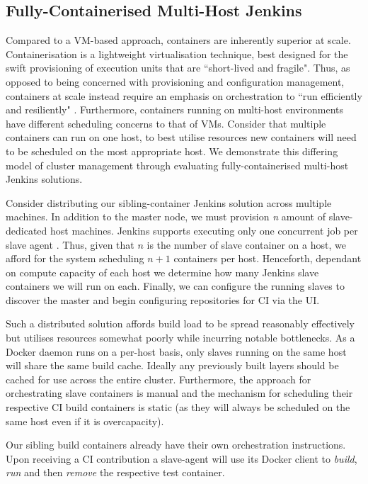 \documentclass[journal]{IEEEtran}
\begin{document}
\subsection{Fully-Containerised Multi-Host Jenkins}
Compared to a VM-based approach, containers are inherently superior at scale.
Containerisation is a lightweight virtualisation technique, best designed for 
the swift provisioning of execution units that are ``short-lived and fragile".
Thus, as opposed to being concerned with provisioning and configuration management,
containers at scale instead require an emphasis on orchestration to ``run efficiently
and resiliently" \citep{Rensin}. Furthermore, containers running on multi-host environments
have different scheduling concerns to that of VMs. Consider that multiple containers can run
on one host, to best utilise resources new containers will need to be scheduled on the most appropriate
host. We demonstrate this differing model of cluster management through evaluating fully-containerised multi-host Jenkins 
solutions.
\par
Consider distributing our sibling-container Jenkins solution across multiple machines.
In addition to the master node, we must provision \textit{n} amount of slave-dedicated host machines. 
Jenkins supports executing only one concurrent job per slave agent \citep{Smart}. Thus, given that \(n\) is the number
of slave container on a host, we afford for the system scheduling \(n+1\) containers per host. Henceforth, 
dependant on compute capacity of each host we determine how many Jenkins slave containers we will run on each. 
Finally,  we can configure the running slaves to discover the master and begin configuring repositories for CI via the UI. 
\par 
Such a distributed solution
affords build load to be spread reasonably effectively but utilises resources somewhat poorly while incurring notable bottlenecks.
As a Docker daemon runs on a per-host basis, only slaves running on the same host will share the same
build cache. Ideally any previously built layers should be cached for use across the entire cluster.
Furthermore, the approach for orchestrating slave containers
is manual and the mechanism for scheduling their respective CI build containers is static (as they will always
be scheduled on the same host even if it is overcapacity).
\par
Our sibling build containers already have their own orchestration instructions. Upon receiving a CI contribution a 
slave-agent will use its Docker client to \textit{build}, \textit{run} and then \textit{remove} the respective test container.
\end{document}
